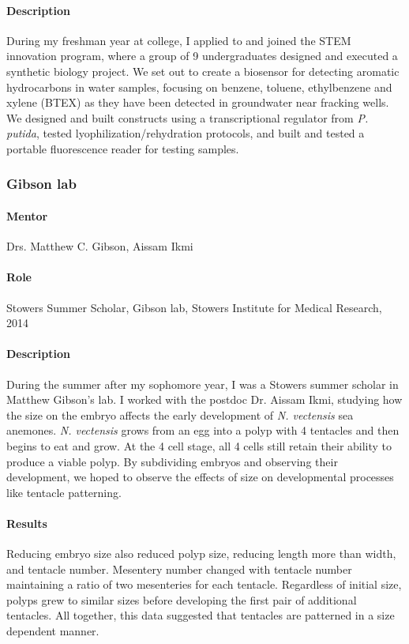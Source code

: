 \documentclass[11pt]{article}
\begin{document}
\paragraph{Description}
During my freshman year at college, I applied to and joined the STEM innovation program, where a group of 9 undergraduates designed and executed a synthetic biology project. 
We set out to create a biosensor for detecting aromatic hydrocarbons in water samples, focusing on benzene, toluene, ethylbenzene and xylene (BTEX) as they have been detected in groundwater near fracking wells. 
We designed and built constructs using a transcriptional regulator from \textit{P. putida}, tested lyophilization/rehydration protocols, and built and tested a portable fluorescence reader for testing samples. 
%
\subsubsection{Gibson lab}
%
\paragraph{Mentor}
Drs. Matthew C. Gibson, Aissam Ikmi
%
\paragraph{Role}
Stowers Summer Scholar, Gibson lab, Stowers Institute for Medical Research, 2014
%
\paragraph{Description}
During the summer after my sophomore year, I was a Stowers summer scholar in Matthew Gibson's lab.
I worked with the postdoc Dr. Aissam Ikmi, studying how the size on the embryo affects the early development of \textit{N. vectensis} sea anemones.
\textit{N. vectensis} grows from an egg into a polyp with 4 tentacles and then begins to eat and grow.
At the 4 cell stage, all 4 cells still retain their ability to produce a viable polyp.
By subdividing embryos and observing their development, we hoped to observe the effects of size on developmental processes like tentacle patterning.
%
\paragraph{Results}
Reducing embryo size also reduced polyp size, reducing length more than width, and tentacle number.
Mesentery number changed with tentacle number maintaining a ratio of two mesenteries for each tentacle.
Regardless of initial size, polyps grew to similar sizes before developing the first pair of additional tentacles.
All together, this data suggested that tentacles are patterned in a size dependent manner.
%
\end{document}
